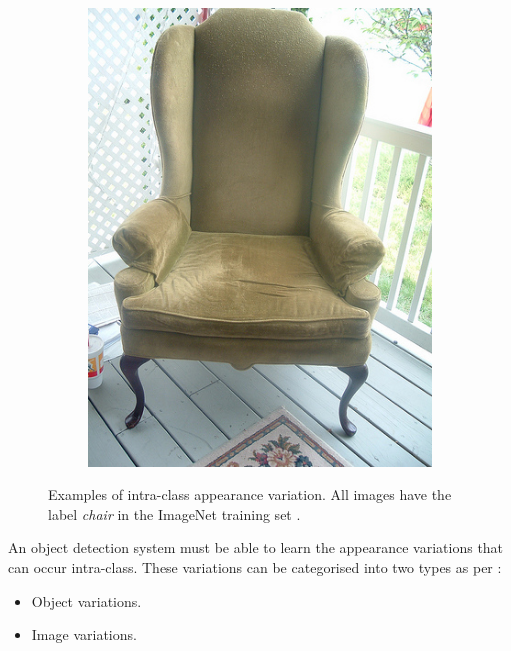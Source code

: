 \begin{figure}[H]
\begin{subfigure}[b]{0.2\textwidth}
        \includegraphics[width=\textwidth]{Figs/Problem/chair4.jpeg}
        \caption{}
    \end{subfigure}
    \caption{Examples of intra-class appearance variation. All images have the label \textit{chair} in the ImageNet training set \cite{imagenet}.}
    \label{fig:intra_ex}
\end{figure} 

An object detection system must be able to learn  the appearance variations that can occur intra-class. These variations can be categorised into two types as per \cite{schroff}:

\begin{itemize}
	\item Object variations.
	\item Image variations.
\end{itemize}



